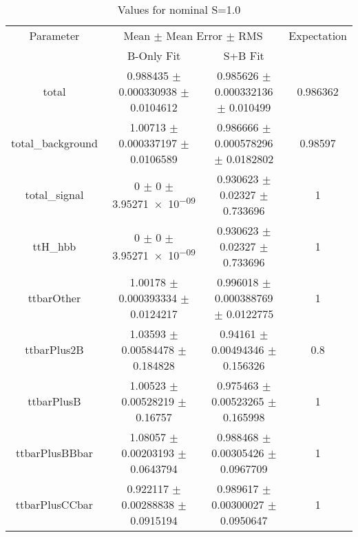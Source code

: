 \begin{table}
\centering
\caption{Values for nominal S=1.0}
\begin{tabular}{cccc}
\toprule
Parameter & \multicolumn{2}{c}{Mean $\pm$ Mean Error $\pm$ RMS} & Expectation\\
 & B-Only Fit & S+B Fit & \\
\midrule
total & \num{0.988435} $\pm$ \num{0.000330938} $\pm$ \num{0.0104612} & \num{0.985626} $\pm$ \num{0.000332136} $\pm$ \num{0.010499} & \num{0.986362}\\
total\_background & \num{1.00713} $\pm$ \num{0.000337197} $\pm$ \num{0.0106589} & \num{0.986666} $\pm$ \num{0.000578296} $\pm$ \num{0.0182802} & \num{0.98597}\\
total\_signal & \num{0} $\pm$ \num{0} $\pm$ \num{3.95271e-09} & \num{0.930623} $\pm$ \num{0.02327} $\pm$ \num{0.733696} & \num{1}\\
ttH\_hbb & \num{0} $\pm$ \num{0} $\pm$ \num{3.95271e-09} & \num{0.930623} $\pm$ \num{0.02327} $\pm$ \num{0.733696} & \num{1}\\
ttbarOther & \num{1.00178} $\pm$ \num{0.000393334} $\pm$ \num{0.0124217} & \num{0.996018} $\pm$ \num{0.000388769} $\pm$ \num{0.0122775} & \num{1}\\
ttbarPlus2B & \num{1.03593} $\pm$ \num{0.00584478} $\pm$ \num{0.184828} & \num{0.94161} $\pm$ \num{0.00494346} $\pm$ \num{0.156326} & \num{0.8}\\
ttbarPlusB & \num{1.00523} $\pm$ \num{0.00528219} $\pm$ \num{0.16757} & \num{0.975463} $\pm$ \num{0.00523265} $\pm$ \num{0.165998} & \num{1}\\
ttbarPlusBBbar & \num{1.08057} $\pm$ \num{0.00203193} $\pm$ \num{0.0643794} & \num{0.988468} $\pm$ \num{0.00305426} $\pm$ \num{0.0967709} & \num{1}\\
ttbarPlusCCbar & \num{0.922117} $\pm$ \num{0.00288838} $\pm$ \num{0.0915194} & \num{0.989617} $\pm$ \num{0.00300027} $\pm$ \num{0.0950647} & \num{1}\\
\bottomrule
\end{tabular}
\end{table}